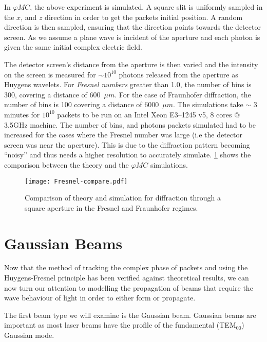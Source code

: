 \medskip

In $\varphi MC$, the above experiment is simulated. 
A square slit is uniformly sampled in the $x$, and $z$ direction in order to get the packets initial position. 
A random direction is then sampled, ensuring that the direction points towards the detector screen.
As we assume a plane wave is incident of the aperture and each photon is given the same initial complex electric field.

The detector screen's distance from the aperture is then varied and the intensity on the screen is measured for $\sim 10^{10}$ photons released from the aperture as Huygens wavelets.
For \textit{Fresnel numbers} greater than 1.0, the number of bins is 300, covering a distance of 600~$\mu m$. 
For the case of Fraunhofer diffraction, the number of bins is 100 covering a distance of 6000~$\mu m$.
The simulations take $\sim$ 3 minutes for $10^{10}$ packets to be run on an Intel Xeon E3--1245 v5, 8 cores @ 3.5GHz machine.
The number of bins, and photons packets simulated had to be increased for the cases where the Fresnel number was large (i.e the detector screen was near the aperture).
This is due to the diffraction pattern becoming ``noisy'' and thus needs a higher resolution to accurately simulate.
\cref{fig:frescompare} shows the comparison between the theory and the $\varphi MC$ simulations.

\begin{figure}[!ht]
    \centering
    \texttt{[image: Fresnel-compare.pdf]}
    \caption{Comparison of theory and simulation for diffraction through a square aperture in the Fresnel and Fraunhofer regimes.}
    \label{fig:frescompare}
\end{figure}

\FloatBarrier

\section{Gaussian Beams}

Now that the method of tracking the complex phase of packets and using the Huygens-Fresnel principle has been verified against theoretical results, we can now turn our attention to modelling the propagation of beams that require the wave behaviour of light in order to either form or propagate.

The first beam type we will examine is the Gaussian beam.
Gaussian beams are important as most laser beams have the profile of the fundamental (TEM$_{00}$) Gaussian mode.

